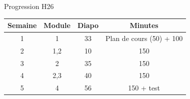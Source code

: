 \documentclass[12pt,french]{article}
\begin{document}
\Large{Progression H26}


\begin{table}[h]
    \centering
    \begin{tabular}{|c|c|c|c|}
    \hline
       Semaine  & Module & Diapo & Minutes \\
       \hline
        1   & 1 & 33 & Plan de cours (50) + 100\\
        \hline
        2 & 1,2 & 10 & 150 \\
        \hline
        3 & 2 & 35 & 150 \\
        \hline
        4 & 2,3 & 40 & 150 \\
        \hline
        5 & 4 & 56 & 150 + test \\
        \hline
    \end{tabular}

\end{table}
\end{document}
